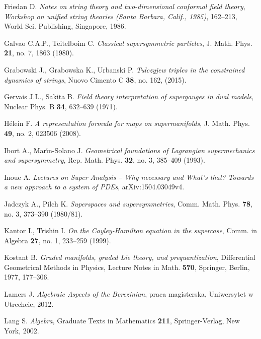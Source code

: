 \documentclass[11pt,a4paper]{report}
\theoremstyle{definition}
\begin{document}
\begin{thebibliography}{}
	Friedan D. \textit{Notes on string theory and two-dimensional conformal field theory}, \textsl{Workshop on unified string theories (Santa Barbara, Calif., 1985)}, 162--213, World Sci. Publishing, Singapore, 1986.
						      					
	Galvao C.A.P., Teitelboim C. {\it Classical supersymmetric particles}, J. Math. Phys. {\bf 21}, no. 7, 1863 (1980).
						      					
	Grabowski J., Grabowska K., Urbanski P. \textit{Tulczyjew triples in the constrained dynamics of strings}, Nuovo Cimento C {\bf 38}, no. 162, (2015).
						      					
	Gervais J.L., Sakita B. 
	{\it Field theory interpretation of supergauges in dual models}, Nuclear Phys. B {\bf 34}, 632--639 (1971). 
						      					
	Hélein F. \textit{A representation formula for maps on supermanifolds},  J. Math. Phys. {\bf 49}, no. 2, 023506 (2008).
						      					
	Ibort A., Mar\'{\i}n-Solano J. \textit{Geometrical foundations of Lagrangian supermechanics and supersymmetry}, Rep. Math. Phys. {\bf 32}, no. 3, 385--409 (1993).
						      					
						      					
	Inoue A. \textit{Lectures on Super Analysis -- Why necessary and What’s that? Towards a new approach to a system of PDEs}, arXiv:1504.03049v4.
						      					
	Jadczyk A., Pilch K. \textit{Superspaces and supersymmetries}, Comm. Math. Phys. {\bf 78}, no. 3, 373--390 (1980/81).
						      					
	Kantor I., Trishin I. \textit{On the Cayley-Hamilton equation in the supercase}, Comm. in Algebra {\bf 27}, no. 1, 233--259  (1999). 
						      					
	Kostant B. \textit{Graded manifolds, graded Lie theory, and prequantization}, Differential Geometrical Methods in Physics, 
	Lecture Notes in Math. {\bf 570}, Springer, Berlin, 1977, 177--306.
						      					
	Lamers J. \textsl{Algebraic Aspects of the Berezinian}, praca magisterska, Uniwersytet w Utrechcie, 2012.
						      					
	Lang S. \textsl{Algebra}, Graduate Texts in Mathematics {\bf 211}, Springer-Verlag, New York, 2002.
						      					

\end{thebibliography}
\end{document}
